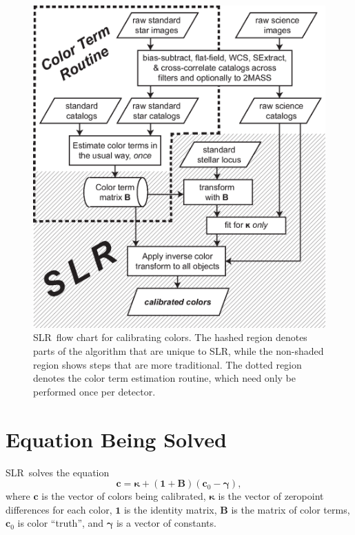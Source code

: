 \documentclass{report}
\newcommand{\zptcolor}{\boldsymbol{\kappa}}
\newcommand{\colorvec}{\boldsymbol{c}}
\newcommand{\colorconst}{\boldsymbol{\gamma}}
\newcommand{\colormatrix}{\mathbf{B}}
\newcommand{\identity}{\boldsymbol{1}}
\newcommand{\slr}{SLR}
\begin{document}
\begin{figure}
\center
\includegraphics[scale=0.9]{fig/slr_algorithm.eps}
\caption{ \slr\ flow chart for calibrating colors.  The hashed region
  denotes parts of the algorithm that are unique to \slr, while the
  non-shaded region shows steps that are more traditional.  The dotted
  region denotes the color term estimation routine, which need only be
  performed once per detector. }
\label{fig:algorithm}
\end{figure}

\section{Equation Being Solved}

\slr\ solves the equation
\begin{equation}
  \label{eqn:transform}
  \colorvec = \zptcolor + (\identity + \colormatrix)(\colorvec_0-\colorconst),
\end{equation}
where $\colorvec$ is the vector of colors being calibrated,
$\zptcolor$ is the vector of zeropoint differences for each color,
$\identity$ is the identity matrix, $\colormatrix$ is the matrix of
color terms, $\colorvec_0$ is color ``truth'', and $\colorconst$ is a
vector of constants.
\end{document}
